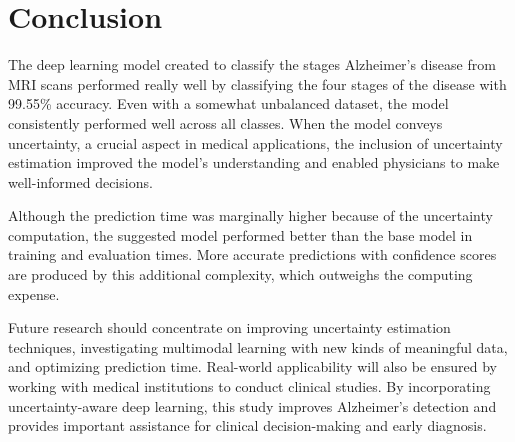 \documentclass[12pt,onecolumn]{report}
\begin{document}
\chapter{Conclusion}
The deep learning model created to classify the stages Alzheimer's disease from MRI scans performed really well by classifying the four stages of the disease with 99.55\% accuracy. Even with a somewhat unbalanced dataset, the model consistently performed well across all classes. When the model conveys uncertainty, a crucial aspect in medical applications, the inclusion of uncertainty estimation improved the model's understanding and enabled physicians to make well-informed decisions.

Although the prediction time was marginally higher because of the uncertainty computation, the suggested model performed better than the base model in training and evaluation times. More accurate predictions with confidence scores are produced by this additional complexity, which outweighs the computing expense.

Future research should concentrate on improving uncertainty estimation techniques, investigating multimodal learning with new kinds of meaningful data, and optimizing prediction time. Real-world applicability will also be ensured by working with medical institutions to conduct clinical studies. By incorporating uncertainty-aware deep learning, this study improves Alzheimer's detection and provides important assistance for clinical decision-making and early diagnosis.



\cleardoublepage
\begin{sloppypar}
\printbibliography
\end{sloppypar}

\end{document}
